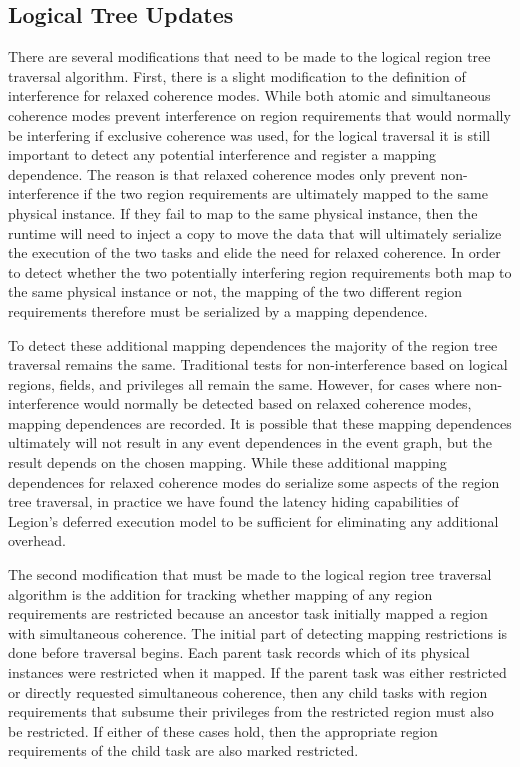 \subsection{Logical Tree Updates}
\label{subsec:logicalupdates}
There are several modifications that need to
be made to the logical region tree traversal
algorithm. First, there is a slight modification
to the definition of interference for relaxed
coherence modes. While both atomic and 
simultaneous coherence modes prevent interference
on region requirements that would normally be
interfering if exclusive coherence was used,
for the logical traversal it is still important
to detect any potential interference and register a
mapping dependence. The reason is that relaxed
coherence modes only prevent non-interference
if the two region requirements are ultimately
mapped to the same physical instance. If they
fail to map to the same physical instance, then
the runtime will need to inject a copy to move
the data that will ultimately serialize the
execution of the two tasks and elide the need
for relaxed coherence. In order to detect whether 
the two potentially interfering region requirements
both map to the same physical instance or not, 
the mapping of the two different region requirements 
therefore must be serialized by a mapping dependence.

To detect these additional mapping dependences
the majority of the region tree traversal remains
the same.  Traditional tests for non-interference
based on logical regions, fields, and privileges
all remain the same. However, for cases where 
non-interference would normally be detected based
on relaxed coherence modes, mapping dependences are
recorded. It is possible that these mapping dependences
ultimately will not result in any event dependences
in the event graph, but the result depends on the
chosen mapping. While these additional mapping
dependences for relaxed coherence modes do serialize
some aspects of the region tree traversal, in 
practice we have found the latency hiding capabilities
of Legion's deferred execution model to be 
sufficient for eliminating any additional overhead.

The second modification that must be made to the
logical region tree traversal algorithm is the 
addition for tracking whether mapping of any region
requirements are restricted because an ancestor
task initially mapped a region with simultaneous
coherence. The initial part of detecting mapping
restrictions is done before traversal begins. 
Each parent task records which of its physical
instances were restricted when it mapped. If the
parent task was either restricted or directly 
requested simultaneous coherence, then any child
tasks with region requirements that subsume their
privileges from the restricted region must also
be restricted. If either of these cases hold, then
the appropriate region requirements of the child
task are also marked restricted.

